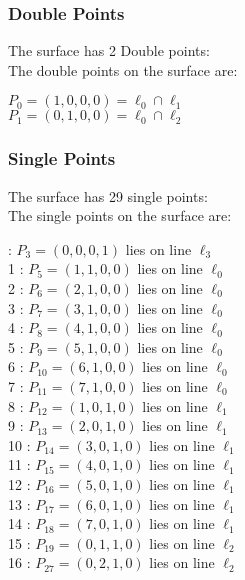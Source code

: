 \documentclass{article}
\begin{document}
{\subsubsection*{Double Points}
The surface has 2 Double points:\\
The double points on the surface are:\\
\begin{multicols}{2}
\noindent
$P_{0} = ( 1, 0, 0, 0 ) = \ell_{0} \cap \ell_{1} $\\
$P_{1} = ( 0, 1, 0, 0 ) = \ell_{0} \cap \ell_{2} $\\
\end{multicols}
\subsubsection*{Single Points}
The surface has 29 single points:\\
The single points on the surface are:\\
\begin{multicols}{2}
 : $P_{3}=( 0, 0, 0, 1 )$ lies on line $\ell_{3}$\\
1 : $P_{5}=( 1, 1, 0, 0 )$ lies on line $\ell_{0}$\\
2 : $P_{6}=( 2, 1, 0, 0 )$ lies on line $\ell_{0}$\\
3 : $P_{7}=( 3, 1, 0, 0 )$ lies on line $\ell_{0}$\\
4 : $P_{8}=( 4, 1, 0, 0 )$ lies on line $\ell_{0}$\\
5 : $P_{9}=( 5, 1, 0, 0 )$ lies on line $\ell_{0}$\\
6 : $P_{10}=( 6, 1, 0, 0 )$ lies on line $\ell_{0}$\\
7 : $P_{11}=( 7, 1, 0, 0 )$ lies on line $\ell_{0}$\\
8 : $P_{12}=( 1, 0, 1, 0 )$ lies on line $\ell_{1}$\\
9 : $P_{13}=( 2, 0, 1, 0 )$ lies on line $\ell_{1}$\\
10 : $P_{14}=( 3, 0, 1, 0 )$ lies on line $\ell_{1}$\\
11 : $P_{15}=( 4, 0, 1, 0 )$ lies on line $\ell_{1}$\\
12 : $P_{16}=( 5, 0, 1, 0 )$ lies on line $\ell_{1}$\\
13 : $P_{17}=( 6, 0, 1, 0 )$ lies on line $\ell_{1}$\\
14 : $P_{18}=( 7, 0, 1, 0 )$ lies on line $\ell_{1}$\\
15 : $P_{19}=( 0, 1, 1, 0 )$ lies on line $\ell_{2}$\\
16 : $P_{27}=( 0, 2, 1, 0 )$ lies on line $\ell_{2}$\\

\end{multicols}}
\end{document}
